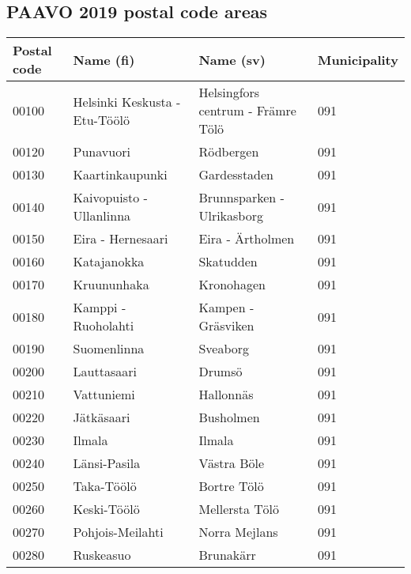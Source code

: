 \subsection{PAAVO 2019 postal code areas}
\justify

\begin{center}
    \begin{longtable}{|l l l l|} 
        \hline
        Postal code & Name (fi) & Name (sv) & Municipality \\ [0.5ex] 
        \hline\hline
        00100 & Helsinki Keskusta - Etu-Töölö & Helsingfors centrum - Främre Tölö & 091 \\ [0.5 ex] \hline
        00120 & Punavuori & Rödbergen & 091 \\ [0.25ex] \hline
        00130 & Kaartinkaupunki & Gardesstaden & 091 \\ [0.25ex] \hline
        00140 & Kaivopuisto - Ullanlinna & Brunnsparken - Ulrikasborg & 091 \\ [0.25ex] \hline
        00150 & Eira - Hernesaari & Eira - Ärtholmen & 091 \\ [0.25ex] \hline
        00160 & Katajanokka & Skatudden & 091 \\ [0.25ex] \hline
        00170 & Kruununhaka & Kronohagen & 091 \\ [0.25ex] \hline
        00180 & Kamppi - Ruoholahti & Kampen - Gräsviken & 091  \\ [0.25ex] \hline
        00190 & Suomenlinna & Sveaborg & 091 \\ [0.25ex] \hline
        00200 & Lauttasaari & Drumsö & 091 \\ [0.25ex] \hline
        00210 & Vattuniemi & Hallonnäs & 091 \\ [0.25ex] \hline
        00220 & Jätkäsaari & Busholmen & 091 \\ [0.25ex] \hline
        00230 & Ilmala & Ilmala & 091 \\ [0.25ex] \hline
        00240 & Länsi-Pasila & Västra Böle & 091 \\ [0.25ex] \hline
        00250 & Taka-Töölö & Bortre Tölö & 091 \\ [0.25ex] \hline
        00260 & Keski-Töölö & Mellersta Tölö & 091 \\ [0.25ex] \hline
        00270 & Pohjois-Meilahti & Norra Mejlans & 091 \\ [0.25ex] \hline
        00280 & Ruskeasuo & Brunakärr & 091 \\ [0.25ex] \hline

\end{longtable}
\end{center}
